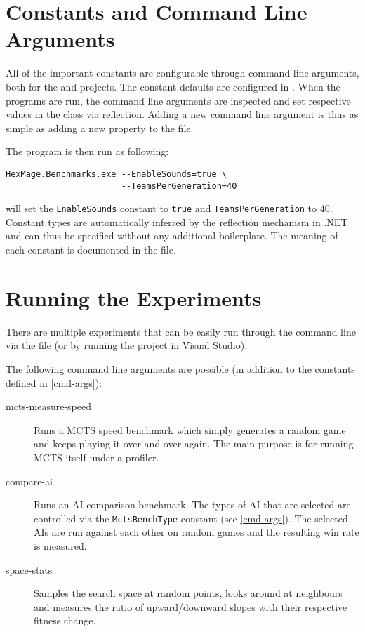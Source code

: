 \section{Constants and Command Line Arguments}
\label{cmd-args}

All of the important constants are configurable through command line arguments, both for the  and  projects. The constant defaults are configured in . When the programs are run, the command line arguments are inspected and set respective values in the  class via reflection. Adding a new command line argument is thus as simple as adding a new property to the  file.

The program is then run as following:

\begin{verbatim}
HexMage.Benchmarks.exe --EnableSounds=true \
                       --TeamsPerGeneration=40
\end{verbatim}

will set the \verb|EnableSounds| constant to \verb|true| and \verb|TeamsPerGeneration| to $40$. Constant types are automatically inferred by the reflection mechanism in .NET and can thus be specified without any additional boilerplate. The meaning of each constant is documented in the  file.

\section{Running the Experiments}

There are multiple experiments that can be easily run through the command line via the  file (or by running the  project in Visual Studio).

The following command line arguments are possible (in addition to the constants defined in \autoref{cmd-args}):

\begin{description}
	\item[mcts-measure-speed] Runs a MCTS speed benchmark which simply generates a random game and keeps playing it over and over again. The main purpose is for running MCTS itself under a profiler.
	
	\item[compare-ai] Runs an AI comparison benchmark. The types of AI that are selected are controlled via the \verb|MctsBenchType| constant (see \autoref{cmd-args}). The selected AIs are run against each other on random games and the resulting win rate is measured.
	
	\item[space-stats] Samples the search space at random points, looks around at neighbours and measures the ratio of upward/downward slopes with their respective fitness change.
\end{description}

